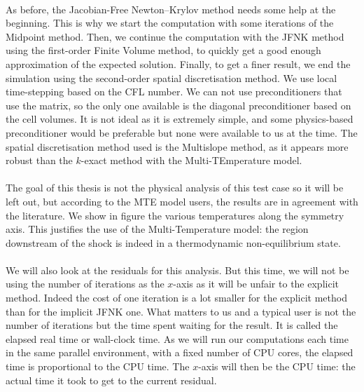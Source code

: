         \paragraph{}
        As before, the Jacobian-Free Newton--Krylov method needs some help at the beginning.
        This is why we start the computation with some iterations of the Midpoint method.
        Then, we continue the computation with the JFNK method using the first-order Finite Volume method, to quickly get a good enough approximation of the expected solution.
        Finally, to get a finer result, we end the simulation using the second-order spatial discretisation method.
        We use local time-stepping based on the CFL number.
        We can not use preconditioners that use the matrix, so the only one available is the diagonal preconditioner based on the cell volumes.
        It is not ideal as it is extremely simple, and some physics-based preconditioner would be preferable \cite{KnollKeyes2004} but none were available to us at the time.
        The spatial discretisation method used is the Multislope method, as it appears more robust than the $k$-exact method with the Multi-TEmperature model.

        \paragraph{}
        The goal of this thesis is not the physical analysis of this test case so it will be left out, but according to the MTE model users, the results are in agreement with the literature.
        We show in figure  the various temperatures along the symmetry axis.
        This justifies the use of the Multi-Temperature model: the region downstream of the shock is indeed in a thermodynamic non-equilibrium state.

        \paragraph{}
        We will also look at the residuals for this analysis.
        But this time, we will not be using the number of iterations as the $x$-axis as it will be unfair to the explicit method.
        Indeed the cost of one iteration is a lot smaller for the explicit method than for the implicit JFNK one.
        What matters to us and a typical user is not the number of iterations but the time spent waiting for the result.
        It is called the elapsed real time or wall-clock time.
        As we will run our computations each time in the same parallel environment, with a fixed number of CPU cores, the elapsed time is proportional to the CPU time.
        The $x$-axis will then be the CPU time: the actual time it took to get to the current residual.

